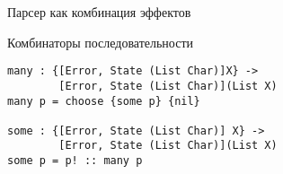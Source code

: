 \begin{frame}[fragile]{Парсер как комбинация эффектов}
\begin{block}{Комбинаторы последовательности}
\begin{verbatim}
many : {[Error, State (List Char)]X} ->
        [Error, State (List Char)](List X)
many p = choose {some p} {nil}

some : {[Error, State (List Char)] X} ->
        [Error, State (List Char)](List X)
some p = p! :: many p
\end{verbatim}
\end{block}
\end{frame}



